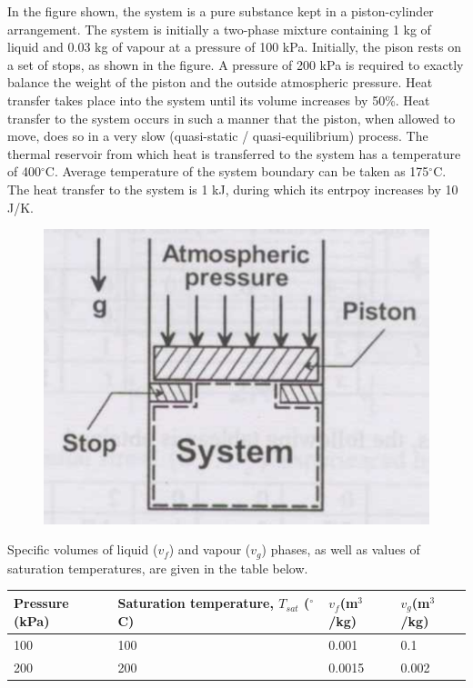 \documentclass[journal,12pt,onecolumn]{IEEEtran}
\begin{document}
\begin{enumerate}
          In the figure shown, the system is a pure substance kept in a piston-cylinder arrangement. The system is initially a two-phase mixture containing 1 kg of liquid and 0.03 kg of vapour at a pressure of 100 kPa. Initially, the pison rests on a set of stops, as shown in the figure. A pressure of 200 kPa is required to exactly balance the weight of the piston and the outside atmospheric pressure. Heat transfer takes place into the system until its volume increases by 50\%. Heat transfer to the system occurs in such a manner that the piston, when allowed to move, does so in a very slow (quasi-static / quasi-equilibrium) process. The thermal reservoir from which heat is transferred to the system has a temperature of 400$^\circ$C. Average temperature of the system boundary can be taken as 175$^\circ$C. The heat transfer to the system is 1 kJ, during which its entrpoy increases by 10 J/K.

          \begin{figure}[H]
              \centering
              \includegraphics[scale=0.3]{q71}
              \caption{}
              \label{q71}
          \end{figure}
          Specific volumes of liquid ($v_f$) and vapour ($v_g$) phases, as well as values of saturation temperatures, are given in the table below.
          \begin{center}
              \begin{tabular}{|l|l|l|l|}
                  \hline
                  Pressure (kPa) & Saturation temperature, $T_{sat}$ ($^\circ$C) & $v_f$(m$^3$/kg) & $v_g$(m$^3$/kg) \\\hline
                  100            & 100                                           & 0.001           & 0.1             \\\hline
                  200            & 200                                           & 0.0015          & 0.002           \\\hline
              \end{tabular}
          \end{center}


\end{enumerate}
\end{document}

